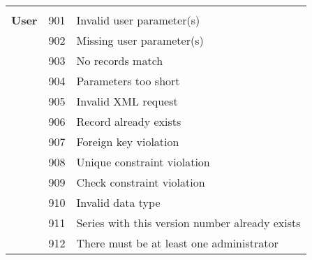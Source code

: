 \begin{longtable}{lll}
  & & \\
  \midrule
  & & \\

  \textbf{User} 
  & 901 & Invalid user parameter(s) \\
  & 902 & Missing user parameter(s) \\
  & 903 & No records match \\
  & 904 & Parameters too short \\
  & 905 & Invalid XML request \\
  & 906 & Record already exists \\
  & 907 & Foreign key violation \\
  & 908 & Unique constraint violation \\
  & 909 & Check constraint violation \\
  & 910 & Invalid data type \\
  & 911 & Series with this version number already exists \\
  & 912 & There must be at least one administrator \\

  \bottomrule
\end{longtable}